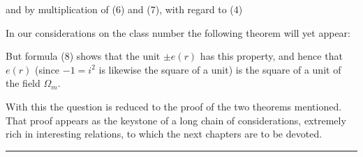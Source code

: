 and by multiplication of (6) and (7), with regard to (4)


In our considerations on the class number the following theorem will yet appear:


But formula (8) shows that the unit $\pm e(r)$ has this property, and hence that $e(r)$ (since $-1 = i^2$ is likewise the square of a unit) is the square of a unit of the field $\Omega_m$.

With this the question is reduced to the proof of the two theorems mentioned. That proof appears as the keystone of a long chain of considerations, extremely rich in interesting relations, to which the next chapters are to be devoted.

\begin{center}
\rule{6em}{0.4pt}
\end{center}
